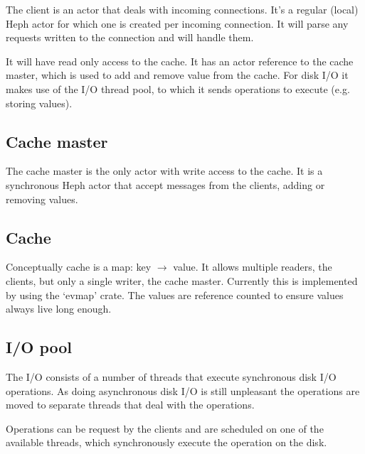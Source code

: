 \documentclass{scrartcl}
\begin{document}
The client is an actor that deals with incoming connections. It's a regular
(local) Heph actor for which one is created per incoming connection. It will
parse any requests written to the connection and will handle them.

It will have read only access to the cache. It has an actor reference to the
cache master, which is used to add and remove value from the cache. For disk I/O
it makes use of the I/O thread pool, to which it sends operations to execute
(e.g. storing values).


\subsection{Cache master} \label{sec:srv_cache_master}

The cache master is the only actor with write access to the cache. It is a
synchronous Heph actor that accept messages from the clients, adding or removing
values.


\subsection{Cache} \label{sec:srv_cache}

Conceptually cache is a map: key $ \rightarrow $ value. It allows multiple
readers, the clients, but only a single writer, the cache master. Currently this
is implemented by using the `evmap' crate. The values are reference counted to
ensure values always live long enough.


\subsection{I/O pool} \label{sec:srv_io_pool}

The I/O consists of a number of threads that execute synchronous disk I/O
operations. As doing asynchronous disk I/O is still unpleasant the operations
are moved to separate threads that deal with the operations.

Operations can be request by the clients and are scheduled on one of the
available threads, which synchronously execute the operation on the disk.
\end{document}
